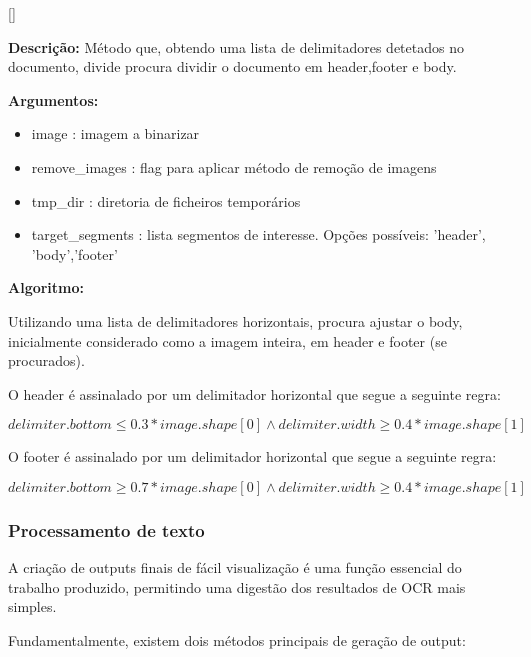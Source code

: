 [\normalsize]

\textbf{Descrição:} Método que, obtendo uma lista de delimitadores detetados no documento, divide procura dividir o documento em header,footer e body.


\textbf{Argumentos:}
\begin{itemize}\setlength\itemsep{-0.3em}
	\item image : imagem a binarizar
	\item remove\_images : flag para aplicar método de remoção de imagens
	\item tmp\_dir : diretoria de ficheiros temporários
	\item target\_segments : lista segmentos de interesse. Opções possíveis: 'header', 'body','footer'
\end{itemize}

\textbf{Algoritmo:} 

Utilizando uma lista de delimitadores horizontais, procura ajustar o body, inicialmente considerado como a imagem inteira, em header e footer (se procurados). 

O header é assinalado por um delimitador horizontal que segue a seguinte regra:

$delimiter.bottom \leq 0.3*image.shape[0] \wedge delimiter.width \geq 0.4*image.shape[1]$

O footer é assinalado por um delimitador horizontal que segue a seguinte regra:

$delimiter.bottom \geq 0.7*image.shape[0] \wedge delimiter.width \geq 0.4*image.shape[1]$





\subsubsection{Processamento de texto}
\label{contribution_text_processing}




A criação de outputs finais de fácil visualização é uma função essencial do trabalho produzido, permitindo uma digestão dos resultados de OCR mais simples.

Fundamentalmente, existem dois métodos principais de geração de output:

